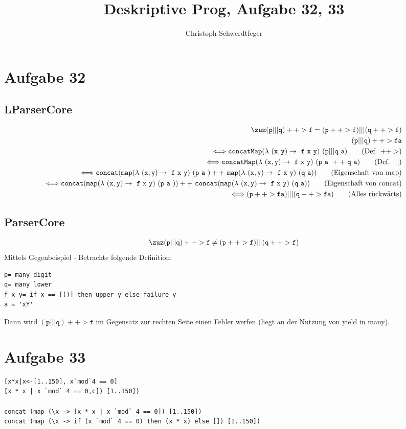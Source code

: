 \documentclass[10pt]{article}
\title{Deskriptive Prog, Aufgabe 32, 33}
\author{Christoph Schwerdtfeger}
\begin{document}
\maketitle
\section{Aufgabe 32}
\subsection{LParserCore}
\begin{align*}
\zuz \mathtt{(p|||q)++>f = (p++>f)|||(q++>f)}
\\ \mathtt{(p|||q)++>f a}
\\\Longleftrightarrow \mathtt{concatMap(\lambda\ (x,y) \rightarrow\ f\ x\ y)\ (p|||q\ a)} \tag{Def. $++>$}
\\\Longleftrightarrow \mathtt{concatMap(\lambda\ (x,y) \rightarrow\ f\ x\ y)\ (p\ a\ ++\ q\ a)} \tag{Def. $|||$}
\\\Longleftrightarrow \mathtt{concat(map(\lambda\ (x,y) \rightarrow\ f\ x\ y)\ (p\ a\ ) ++\ map(\lambda\ (x,y) \rightarrow\ f\ x\ y)\ (q\ a))}\tag{Eigenschaft von map}
\\\Longleftrightarrow \mathtt{concat(map(\lambda\ (x,y) \rightarrow\ f\ x\ y)\ (p\ a\ )) ++\ concat(map(\lambda\ (x,y) \rightarrow\ f\ x\ y)\ (q\ a))} \tag{Eigenschaft von concat}
\\\Longleftrightarrow \mathtt{(p++>f a)|||(q++>f a)} \tag{Alles rückwärts}
\end{align*}
\subsection{ParserCore}
\begin{align*}
\zuz \mathtt{(p|||q)++>f \neq (p++>f)|||(q++>f)}
\end{align*}
Mittels Gegenbeispiel - 
Betrachte folgende Definition: 
\begin{verbatim}
p= many digit
q= many lower
f x y= if x == [()] then upper y else failure y
a = 'xY'
\end{verbatim}
Dann wird $\mathtt{(p|||q)++>f} $ im Gegensatz zur rechten Seite einen Fehler werfen (liegt an der Nutzung von yield in many).

\section{Aufgabe 33}
\begin{verbatim}
[x*x|x<-[1..150], x`mod`4 == 0]
[x * x | x `mod` 4 == 0,c]) [1..150])

concat (map (\x -> [x * x | x `mod` 4 == 0]) [1..150])
concat (map (\x -> if (x `mod` 4 == 0) then (x * x) else []) [1..150])

\end{verbatim}
\end{document}
